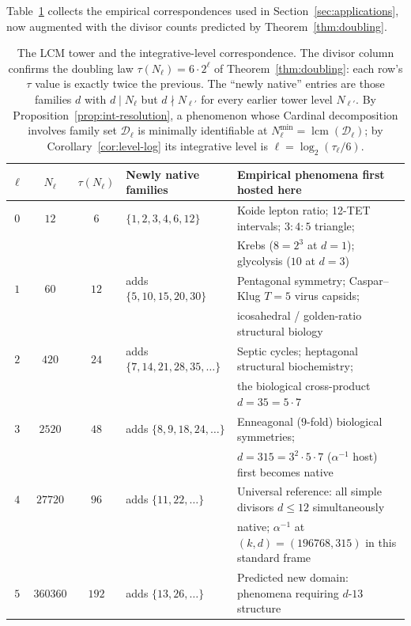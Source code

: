 \documentclass[11pt,a4paper]{article}
\theoremstyle{definition}
\theoremstyle{remark}
\DeclareMathOperator{\lcm}{lcm}
\begin{document}
Table~\ref{tab:int-resolution} collects the empirical correspondences used in Section~\ref{sec:applications}, now augmented with the divisor counts predicted by Theorem~\ref{thm:doubling}.

\begin{table}[h]
\centering
\begin{tabular}{@{}c c c l l@{}}
\toprule
$\ell$ & $N_{\ell}$ & $\tau(N_{\ell})$ & Newly native families & Empirical phenomena first hosted here\\
\midrule
$0$ & $12$ & $6$ & $\{1,2,3,4,6,12\}$ & Koide lepton ratio; 12-TET intervals; $3{:}4{:}5$ triangle;\\
    &      &     &                    & Krebs ($8{=}2^{3}$ at $d{=}1$); glycolysis ($10$ at $d{=}3$)\\
\addlinespace
$1$ & $60$ & $12$ & adds $\{5,10,15,20,30\}$ & Pentagonal symmetry; Caspar--Klug $T{=}5$ virus capsids;\\
    &      &      &                          & icosahedral / golden-ratio structural biology\\
\addlinespace
$2$ & $420$ & $24$ & adds $\{7,14,21,28,35,\ldots\}$ & Septic cycles; heptagonal structural biochemistry;\\
    &       &      &                                 & the biological cross-product $d{=}35{=}5\cdot 7$\\
\addlinespace
$3$ & $2520$ & $48$ & adds $\{8,9,18,24,\ldots\}$ & Enneagonal ($9$-fold) biological symmetries;\\
    &        &      &                             & $d{=}315{=}3^{2}\cdot 5\cdot 7$ ($\alpha^{-1}$ host) first becomes native\\
\addlinespace
$4$ & $27720$ & $96$ & adds $\{11,22,\ldots\}$ & Universal reference: all simple divisors $d\le 12$ simultaneously\\
    &         &      &                         & native; $\alpha^{-1}$ at $(k,d)=(196768,315)$ in this standard frame\\
\addlinespace
$5$ & $360360$ & $192$ & adds $\{13,26,\ldots\}$ & Predicted new domain: phenomena requiring $d$-$13$ structure\\
\bottomrule
\end{tabular}
\caption{The LCM tower and the integrative-level correspondence. The divisor column confirms the doubling law $\tau(N_{\ell}) = 6\cdot 2^{\ell}$ of Theorem~\ref{thm:doubling}: each row's $\tau$ value is exactly twice the previous. The ``newly native'' entries are those families $d$ with $d\mid N_{\ell}$ but $d\nmid N_{\ell'}$ for every earlier tower level $N_{\ell'}$. By Proposition~\ref{prop:int-resolution}, a phenomenon whose Cardinal decomposition involves family set $\mathcal{D}_{\ell}$ is minimally identifiable at $N_{\ell}^{\min}=\lcm(\mathcal{D}_{\ell})$; by Corollary~\ref{cor:level-log} its integrative level is $\ell = \log_{2}(\tau_{\ell}/6)$.}
\label{tab:int-resolution}
\end{table}
\end{document}
